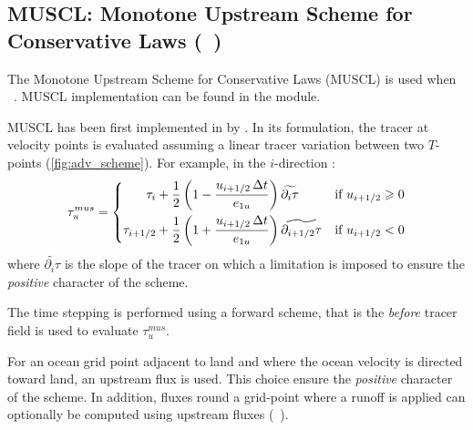 \documentclass[../main/NEMO_manual]{subfiles}
\begin{document}
\subsection{MUSCL: Monotone Upstream Scheme for Conservative Laws (\protect{}~)}
\label{subsec:TRA_adv_mus}

The Monotone Upstream Scheme for Conservative Laws (MUSCL) is used when ~.
MUSCL implementation can be found in the  module.

MUSCL has been first implemented in \NEMO by \citet{Levy_al_GRL01}.
In its formulation, the tracer at velocity points is evaluated assuming a linear tracer variation between
two $T$-points (\autoref{fig:adv_scheme}).
For example, in the $i$-direction :
\begin{equation}
  \tau_u^{mus} = \left\{
  \begin{split}
                       \tau_i         &+ \frac{1}{2} \left( 1 - \frac{u_{i + 1/2} \, \Delta t}{e_{1u}} \right)
                       \widetilde{\partial_i         \tau} & \text{if~} u_{i + 1/2} \geqslant 0 \\
                       \tau_{i + 1/2} &+ \frac{1}{2} \left( 1 + \frac{u_{i + 1/2} \, \Delta t}{e_{1u}} \right)
                       \widetilde{\partial_{i + 1/2} \tau} & \text{if~} u_{i + 1/2} <         0
  \end{split}
                                                                                                      \right.
\end{equation}
where $\widetilde{\partial_i \tau}$ is the slope of the tracer on which a limitation is imposed to
ensure the \textit{positive} character of the scheme.

The time stepping is performed using a forward scheme, that is the \textit{before} tracer field is used to
evaluate $\tau_u^{mus}$.

For an ocean grid point adjacent to land and where the ocean velocity is directed toward land,
an upstream flux is used.
This choice ensure the \textit{positive} character of the scheme.
In addition, fluxes round a grid-point where a runoff is applied can optionally be computed using upstream fluxes
(~).
\end{document}
